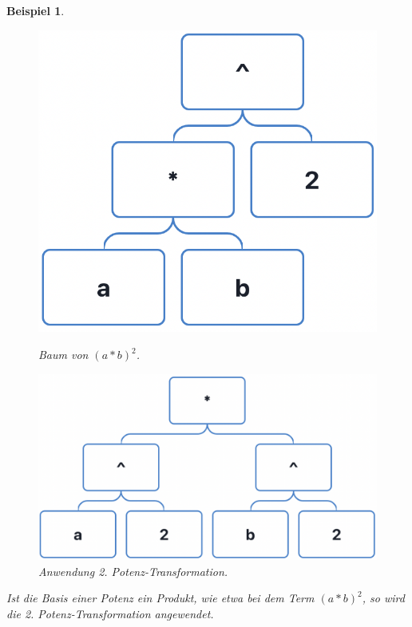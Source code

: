 \documentclass[11pt]{article}
\newtheorem{example}{Beispiel}
\begin{document}
\begin{example} \normalfont
  \begin{figure}[h]
    \begin{minipage}{.5\textwidth}
      \centering
      \includegraphics[scale=0.4]{trees/power/beispiel_3_1.png}
      \caption{Baum von ${(a*b)^2}$.}
    \end{minipage}
    \begin{minipage}{.5\textwidth}
      \centering
      \includegraphics[scale=0.4]{trees/power/beispiel_3_2.png}
      \caption{Anwendung 2. Potenz-Transformation.}
    \end{minipage}
  \end{figure}
  Ist die Basis einer Potenz ein Produkt, wie etwa bei dem Term ${{(a*b)}^2}$, so wird die 2.
  Potenz-Transformation angewendet.
\end{example}
\end{document}
